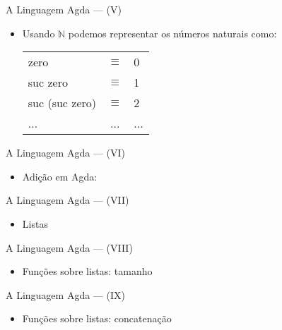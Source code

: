 \documentclass{beamer}
\begin{document}
       \begin{frame}{A Linguagem Agda --- (V)}
         \begin{itemize}
           \item Usando $\mathbb{N}$ podemos representar os n\'umeros naturais como:

           \begin{table}
             \begin{tabular}{lcl}
               zero     & $\equiv$ & 0\\
               suc zero & $\equiv$ & 1\\
               suc (suc zero) & $\equiv$ & 2 \\
               ...            & ... &    ...
             \end{tabular}
           \end{table}
         \end{itemize}
       \end{frame}

       \begin{frame}{A Linguagem Agda --- (VI)}
         \begin{itemize}
           \item Adi\c{c}\~ao em Agda:
         \end{itemize}
       \end{frame}

       \begin{frame}{A Linguagem Agda --- (VII)}
         \begin{itemize}
           \item Listas
         \end{itemize}
       \end{frame}

       \begin{frame}{A Linguagem Agda --- (VIII)}
         \begin{itemize}
           \item Fun\c{c}\~oes sobre listas: tamanho
         \end{itemize}
       \end{frame}
       
       \begin{frame}{A Linguagem Agda --- (IX)}
         \begin{itemize}
           \item Fun\c{c}\~oes sobre listas: concatena\c{c}\~ao
         \end{itemize}
       \end{frame}
\end{document}
